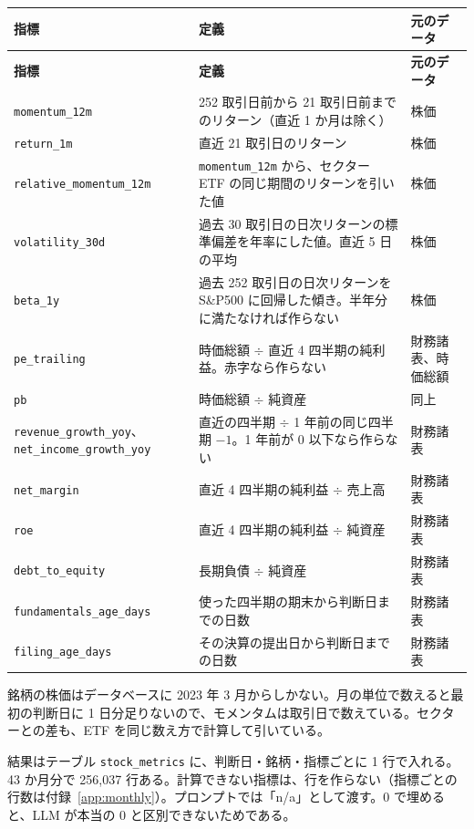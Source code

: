 \documentclass[xelatex,ja=standard,jafont=hiragino-pron,a4paper,10pt]{bxjsreport}
\newcommand{\SP}{S\&P500}
\newcommand{\code}[1]{\texttt{#1}}
\begin{document}
\begin{longtable}{p{4.20cm}p{7.40cm}p{2.80cm}}
\toprule
\textbf{指標} & \textbf{定義} & \textbf{元のデータ} \\
\midrule
\endfirsthead
\toprule
\textbf{指標} & \textbf{定義} & \textbf{元のデータ} \\
\midrule
\endhead
\bottomrule
\endfoot
\code{momentum\_12m} & 252 取引日前から 21 取引日前までのリターン（直近 1 か月は除く） & 株価 \\
\code{return\_1m} & 直近 21 取引日のリターン & 株価 \\
\code{relative\_momentum\_12m} & \code{momentum\_12m} から、セクター ETF の同じ期間のリターンを引いた値 & 株価 \\
\code{volatility\_30d} & 過去 30 取引日の日次リターンの標準偏差を年率にした値。直近 5 日の平均 & 株価 \\
\code{beta\_1y} & 過去 252 取引日の日次リターンを \SP{} に回帰した傾き。半年分に満たなければ作らない & 株価 \\
\code{pe\_trailing} & 時価総額 $\div$ 直近 4 四半期の純利益。赤字なら作らない & 財務諸表、時価総額 \\
\code{pb} & 時価総額 $\div$ 純資産 & 同上 \\
\code{revenue\_growth\_yoy}、\code{net\_income\_growth\_yoy} & 直近の四半期 $\div$ 1 年前の同じ四半期 $- 1$。1 年前が 0 以下なら作らない & 財務諸表 \\
\code{net\_margin} & 直近 4 四半期の純利益 $\div$ 売上高 & 財務諸表 \\
\code{roe} & 直近 4 四半期の純利益 $\div$ 純資産 & 財務諸表 \\
\code{debt\_to\_equity} & 長期負債 $\div$ 純資産 & 財務諸表 \\
\code{fundamentals\_age\_days} & 使った四半期の期末から判断日までの日数 & 財務諸表 \\
\code{filing\_age\_days} & その決算の提出日から判断日までの日数 & 財務諸表 \\
\end{longtable}

銘柄の株価はデータベースに 2023 年 3 月からしかない。月の単位で数えると最初の判断日に 1 日分足りないので、モメンタムは取引日で数えている。セクターとの差も、ETF を同じ数え方で計算して引いている。

結果はテーブル \code{stock\_metrics} に、判断日・銘柄・指標ごとに 1 行で入れる。43 か月分で 256,037 行ある。計算できない指標は、行を作らない（指標ごとの行数は付録~\ref{app:monthly}）。プロンプトでは「n/a」として渡す。0 で埋めると、LLM が本当の 0 と区別できないためである。
\end{document}
